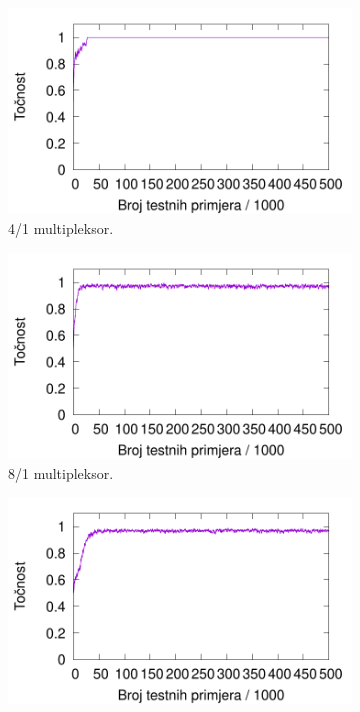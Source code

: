\documentclass[times, utf8, zavrsni]{fer}
\begin{document}
\begin{figure}[h]
    \centering
    \begin{subfigure}{0.496\textwidth}
        \centering
        \includegraphics[width=\textwidth]{img/multiplexer/6muxre.pdf}
        \caption{4/1 multipleksor.}
        \label{fig:6muxre}
    \end{subfigure}
    \begin{subfigure}{0.496\textwidth}
        \centering
        \includegraphics[width=\textwidth]{img/multiplexer/11muxre.pdf}
        \caption{8/1 multipleksor.}
        \label{fig:11muxre}
    \end{subfigure}
    \begin{subfigure}{0.496\textwidth}
        \centering
        \includegraphics[width=\textwidth]{img/multiplexer/20muxre.pdf}

\end{subfigure}
\end{figure}
\end{document}
